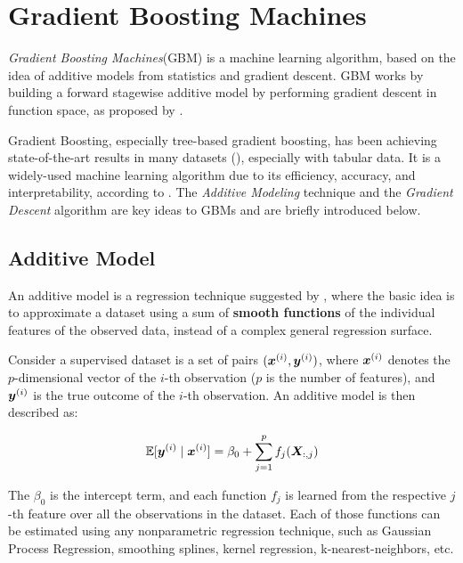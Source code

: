 \chapter{Gradient Boosting Machines}
\label{cap:boosting-intro}

\textit{Gradient Boosting Machines}(GBM) is a machine learning algorithm, based on the idea of additive models from statistics and gradient descent. GBM works by building a forward stagewise additive model by performing gradient descent in function space, as proposed by \cite{gbmdef}. 

Gradient Boosting, especially tree-based gradient boosting, has been achieving state-of-the-art results in many datasets (\cite{li2012robust}), especially with tabular data. It is a widely-used machine learning algorithm due to its efficiency, accuracy, and interpretability, according to \cite{ke2017lightgbm}. The \textit{Additive Modeling} technique and the \textit{Gradient Descent} algorithm are key ideas to GBMs and are briefly introduced below.

\section{Additive Model}
An additive model is a  regression technique suggested by , where the basic idea is to approximate a dataset using a sum of \textbf{smooth functions} of the individual features of the observed data, instead of a complex general regression surface.

Consider a supervised dataset is a set of pairs $(\bm{x}^{(i)},\bm{y}^{(i)})$, where $\bm{x}^{(i)}$ denotes the $p$-dimensional vector of the $i$-th observation ($p$ is the number of features), and $\bm{y}^{(i)}$ is the true outcome of the $i$-th observation. An additive model is then described as:

\begin{equation}\label{eq:additive}
\mathbb{E}[\bm{y}^{(i)}\mid \bm{x}^{(i)}] = \beta_0 + \sum_{j=1}^pf_j(\bm{X}_{:, j})
\end{equation}

The $\beta_0$ is the intercept term, and each function $f_j$ is learned from the respective $j$-th feature over all the observations in the dataset. Each of those functions can be estimated using any nonparametric regression technique, such as Gaussian Process Regression, smoothing splines, kernel regression, k-nearest-neighbors, etc.

